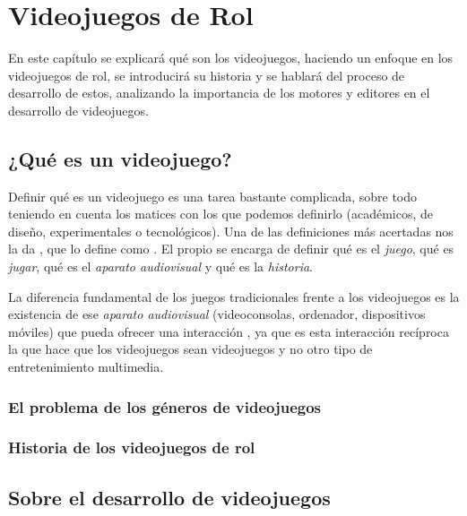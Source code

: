 \chapter{Videojuegos de Rol}
\label{cap:videojuegosrol}

\begin{resumen}
En este capítulo se explicará qué son los videojuegos, haciendo un enfoque en los videojuegos de rol, se introducirá su historia y se hablará del proceso de desarrollo de estos, analizando la importancia de los motores y editores en el desarrollo de videojuegos.
\end{resumen}

\section{¿Qué es un videojuego?}
Definir qué es un videojuego es una tarea bastante complicada, sobre todo teniendo en cuenta los matices con los que podemos definirlo (académicos, de diseño, experimentales o tecnológicos). Una de las definiciones más acertadas nos la da \cite{EspositoVJ}, que lo define como . El propio \citeauthor{EspositoVJ} se encarga de definir qué es el \textit{juego}, qué es \textit{jugar}, qué es el \textit{aparato audiovisual} y qué es la \textit{historia}.

\smallskip

La diferencia fundamental de los juegos tradicionales frente a los videojuegos es la existencia de ese \textit{aparato audiovisual} (videoconsolas, ordenador, dispositivos móviles) que pueda ofrecer una interacción , ya que es esta interacción recíproca la que hace que los videojuegos sean videojuegos y no otro tipo de entretenimiento multimedia.

\subsection{El problema de los géneros de videojuegos}

\subsection{Historia de los videojuegos de rol}

\section{Sobre el desarrollo de videojuegos}

